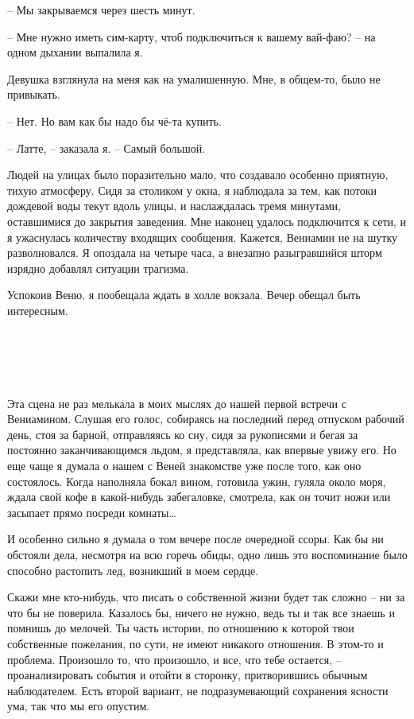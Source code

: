 \documentclass[
]{book}
\begin{document}
-- Мы закрываемся через шесть минут.

-- Мне нужно иметь сим-карту, чтоб подключиться к вашему вай-фаю? -- на одном дыхании выпалила я.

Девушка взглянула на меня как на умалишенную. Мне, в общем-то, было не привыкать.

-- Нет. Но вам как бы надо бы чё-та купить.

-- Латте, -- заказала я. -- Самый большой.

Людей на улицах было поразительно мало, что создавало особенно приятную, тихую атмосферу. Сидя за столиком у окна, я наблюдала за тем, как потоки дождевой воды текут вдоль улицы, и наслаждалась тремя минутами, оставшимися до закрытия заведения. Мне наконец удалось подключится к сети, и я ужаснулась количеству входящих сообщения. Кажется, Вениамин не на шутку разволновался. Я опоздала на четыре часа, а внезапно разыгравшийся шторм изрядно добавлял ситуации трагизма.

Успокоив Веню, я пообещала ждать в холле вокзала. Вечер обещал быть интересным.

\hypertarget{chapter-8}{%
\chapter{~}\label{chapter-8}}

Эта сцена не раз мелькала в моих мыслях до нашей первой встречи с Вениамином. Слушая его голос, собираясь на последний перед отпуском рабочий день, стоя за барной, отправляясь ко сну, сидя за рукописями и бегая за постоянно заканчивающимся льдом, я представляла, как впервые увижу его. Но еще чаще я думала о нашем с Веней знакомстве уже после того, как оно состоялось. Когда наполняла бокал вином, готовила ужин, гуляла около моря, ждала свой кофе в какой-нибудь забегаловке, смотрела, как он точит ножи или засыпает прямо посреди комнаты\ldots{}

И особенно сильно я думала о том вечере после очередной ссоры. Как бы ни обстояли дела, несмотря на всю горечь обиды, одно лишь это воспоминание было способно растопить лед, возникший в моем сердце.

Скажи мне кто-нибудь, что писать о собственной жизни будет так сложно -- ни за что бы не поверила. Казалось бы, ничего не нужно, ведь ты и так все знаешь и помнишь до мелочей. Ты часть истории, по отношению к которой твои собственные пожелания, по сути, не имеют никакого отношения. В этом-то и проблема. Произошло то, что произошло, и все, что тебе остается, -- проанализировать события и отойти в сторонку, притворившись обычным наблюдателем. Есть второй вариант, не подразумевающий сохранения ясности ума, так что мы его опустим.
\end{document}
